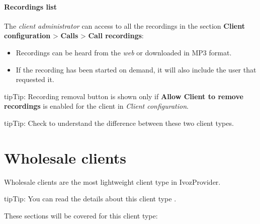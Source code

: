 \documentclass[letterpaper,10pt,english]{sphinxmanual}
\begin{document}
\paragraph{Recordings list}
\label{administration_portal/client/retail/calls/call_recordings:recordings-list}
The \emph{client administrator} can access to all the recordings in the section
\textbf{Client configuration} \textgreater{} \textbf{Calls} \textgreater{} \textbf{Call recordings}:
\begin{itemize}
\item {} 
Recordings can be heard from the \emph{web} or downloaded in MP3 format.

\item {} 
If the recording has been started on demand, it will also include the user
that requested it.

\end{itemize}

\begin{notice}{tip}{Tip:}
Recording removal button is shown only if \textbf{Allow Client to remove recordings} is enabled
for the client in \emph{Client configuration}.
\end{notice}

\begin{notice}{tip}{Tip:}
Check {\hyperref[administration_portal/brand/clients/retail:differences\string-between\string-retail\string-and\string-residential\string-clients]{}} to understand the difference between these two
client types.
\end{notice}


\section{Wholesale clients}
\label{administration_portal/client/wholesale/index:wholesale-clients}\label{administration_portal/client/wholesale/index::doc}
Wholesale clients are the most lightweight client type in IvozProvider.

\begin{notice}{tip}{Tip:}
You can read the details about this client type {\hyperref[administration_portal/brand/clients/wholesale:wholesale\string-clients]{}}.
\end{notice}

These sections will be covered for this client type:
\end{document}
